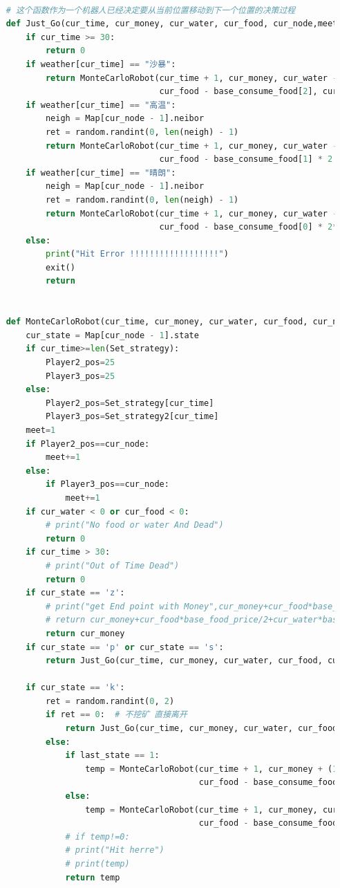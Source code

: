 \documentclass[withoutpreface,bwprint]{cumcmthesis} %
\begin{document}
\begin{appendices}
\begin{lstlisting}[language=python]
    
    # 这个函数作为一个机器人已经决定要从当前位置移动到下一个位置的决策过程
    def Just_Go(cur_time, cur_money, cur_water, cur_food, cur_node,meet):
        if cur_time >= 30:
            return 0
        if weather[cur_time] == "沙暴":
            return MonteCarloRobot(cur_time + 1, cur_money, cur_water - base_consume_water[2],
                                   cur_food - base_consume_food[2], cur_node)
        if weather[cur_time] == "高温":
            neigh = Map[cur_node - 1].neibor
            ret = random.randint(0, len(neigh) - 1)
            return MonteCarloRobot(cur_time + 1, cur_money, cur_water - base_consume_water[1] * 2 * meet,
                                   cur_food - base_consume_food[1] * 2 * meet, neigh[ret])
        if weather[cur_time] == "晴朗":
            neigh = Map[cur_node - 1].neibor
            ret = random.randint(0, len(neigh) - 1)
            return MonteCarloRobot(cur_time + 1, cur_money, cur_water - base_consume_water[0] * 2* meet,
                                   cur_food - base_consume_food[0] * 2* meet, neigh[ret])
        else:
            print("Hit Error !!!!!!!!!!!!!!!!!!")
            exit()
            return
    
    
    def MonteCarloRobot(cur_time, cur_money, cur_water, cur_food, cur_node, last_state=0):
        cur_state = Map[cur_node - 1].state
        if cur_time>=len(Set_strategy):
            Player2_pos=25
            Player3_pos=25
        else:
            Player2_pos=Set_strategy[cur_time]
            Player3_pos=Set_strategy2[cur_time]
        meet=1
        if Player2_pos==cur_node:
            meet+=1
        else:
            if Player3_pos==cur_node:
                meet+=1
        if cur_water < 0 or cur_food < 0:
            # print("No food or water And Dead")
            return 0
        if cur_time > 30:
            # print("Out of Time Dead")
            return 0
        if cur_state == 'z':
            # print("get End point with Money",cur_money+cur_food*base_food_price/2+cur_water*base_water_price/2)
            # return cur_money+cur_food*base_food_price/2+cur_water*base_water_price/2
            return cur_money
        if cur_state == 'p' or cur_state == 's':
            return Just_Go(cur_time, cur_money, cur_water, cur_food, cur_node,meet)
    
        if cur_state == 'k':
            ret = random.randint(0, 2)
            if ret == 0:  # 不挖矿 直接离开
                return Just_Go(cur_time, cur_money, cur_water, cur_food, cur_node,meet)
            else:
                if last_state == 1:
                    temp = MonteCarloRobot(cur_time + 1, cur_money + (1000/meet), cur_water - base_consume_water[0] * 3,
                                           cur_food - base_consume_food[0] * 3, cur_node, 1)
                else:
                    temp = MonteCarloRobot(cur_time + 1, cur_money, cur_water - base_consume_water[0],
                                           cur_food - base_consume_food[0], cur_node, 1)
                # if temp!=0:
                # print("Hit herre")
                # print(temp)
                return temp
    

\end{lstlisting}
\end{appendices}
\end{document}
